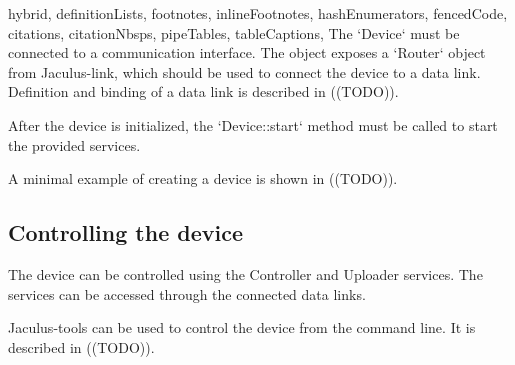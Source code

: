 \begin{markdown*}{%
  hybrid,
  definitionLists,
  footnotes,
  inlineFootnotes,
  hashEnumerators,
  fencedCode,
  citations,
  citationNbsps,
  pipeTables,
  tableCaptions,
}
The `Device` must be connected to a communication interface. The object exposes a `Router` object from Jaculus-link, which should be used to connect the device to a data link. Definition and binding of a data link is described in ((TODO)).

After the device is initialized, the `Device::start` method must be called to start the provided services.

A minimal example of creating a device is shown in ((TODO)).

\subsection{Controlling the device}

The device can be controlled using the Controller and Uploader services. The services can be accessed through the connected data links.

Jaculus-tools can be used to control the device from the command line. It is described in ((TODO)).


\end{markdown*}
